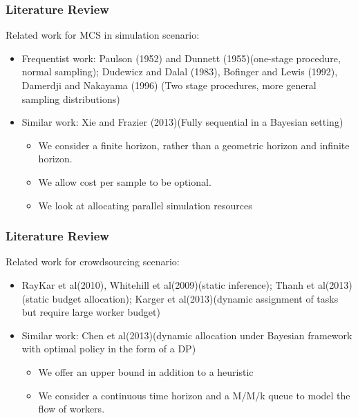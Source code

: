 \documentclass{beamer}
\begin{document}
\begin{frame}
\frametitle{Literature Review}

Related work for MCS in simulation scenario:
\begin{itemize}
\item Frequentist work: Paulson (1952) and Dunnett (1955)(one-stage procedure, normal sampling); Dudewicz and Dalal (1983), Bofinger and Lewis (1992), Damerdji and Nakayama (1996) (Two stage procedures, more general sampling distributions)
\item Similar work: Xie and Frazier (2013)(Fully sequential in a Bayesian setting)
\begin{itemize}
\item We consider a finite horizon, rather than a geometric horizon and infinite horizon.
\item We allow cost per sample to be optional.
\item We look at allocating parallel simulation resources
\end{itemize}
\end{itemize}
\end{frame}


\begin{frame}
\frametitle{Literature Review}

Related work for crowdsourcing scenario:
\begin{itemize}
\item RayKar et al(2010), Whitehill et al(2009)(static inference); Thanh et al(2013)(static budget allocation); Karger et al(2013)(dynamic assignment of tasks but require large worker budget)
\item Similar work: Chen et al(2013)(dynamic allocation under Bayesian framework with optimal policy in the form of a DP)
\begin{itemize}
\item We offer an upper bound in addition to a heuristic
\item We consider a continuous time horizon and a M/M/k queue to model the flow of workers.
\end{itemize}
\end{itemize}
\end{frame}
\end{document}
